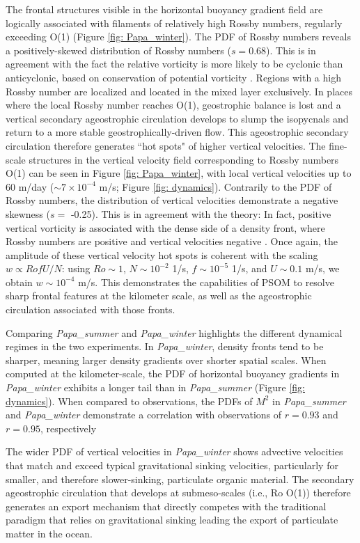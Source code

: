 \documentclass[draft,linenumbers]{agujournal2018}
\begin{document}
The frontal structures visible in the horizontal buoyancy gradient field are logically associated with filaments of relatively high Rossby numbers, regularly exceeding O(1) (Figure \ref{fig: Papa_winter}). The PDF of Rossby numbers reveals a positively-skewed distribution of Rossby numbers ($s = 0.68$). This is in agreement with the fact the relative vorticity is more likely to be cyclonic than anticyclonic, based on conservation of potential vorticity \citep{Hoskins_1972}. Regions with a high Rossby number are localized and located in the mixed layer exclusively. In places where the local Rossby number reaches O(1), geostrophic balance is lost and a vertical secondary ageostrophic circulation develops to slump the isopycnals and return to a more stable geostrophically-driven flow. This ageostrophic secondary circulation therefore generates ``hot spots" of higher vertical velocities. The fine-scale structures in the vertical velocity field corresponding to Rossby numbers O(1) can be seen in Figure \ref{fig: Papa_winter}, with local vertical velocities up to 60 m/day ($\sim 7\times10^{-4}$ m/s; Figure \ref{fig: dynamics}). Contrarily to the PDF of Rossby numbers, the distribution of vertical velocities demonstrate a negative skewness ($s =$ -0.25). This is in agreement with the theory: In fact, positive vertical vorticity is associated with the dense side of a density front, where Rossby numbers are positive and vertical velocities negative \citep{Mahadevan_2016}. Once again, the amplitude of these vertical velocity hot spots is coherent with the scaling $w \propto RofU/N$: using $Ro\sim1$, $N\sim10^{-2}$ 1/s, $f\sim10^{-5}$ 1/s, and $U\sim0.1$ m/s, we obtain $w\sim 10^{-4}$ m/s. This demonstrates the capabilities of PSOM to resolve sharp frontal features at the kilometer scale, as well as the ageostrophic circulation associated with those fronts. 

Comparing \textit{Papa\_summer} and \textit{Papa\_winter} highlights the different dynamical regimes in the two experiments. In \textit{Papa\_winter}, density fronts tend to be sharper, meaning larger density gradients over shorter spatial scales. When computed at the kilometer-scale, the PDF of horizontal buoyancy gradients in \textit{Papa\_winter} exhibits a longer tail than in \textit{Papa\_summer} (Figure \ref{fig: dynamics}). When compared to observations, the PDFs of $M^2$ in \textit{Papa\_summer} and \textit{Papa\_winter} demonstrate a correlation with observations of $r = 0.93$ and $r = 0.95$, respectively


The wider PDF of vertical velocities in \textit{Papa\_winter} shows advective velocities that match and exceed typical gravitational sinking velocities, particularly for smaller, and therefore slower-sinking, particulate organic material. The secondary ageostrophic circulation that develops at submeso-scales (i.e., Ro O(1)) therefore generates an export mechanism that directly competes with the traditional paradigm that relies on gravitational sinking leading the export of particulate matter in the ocean.
\end{document}
